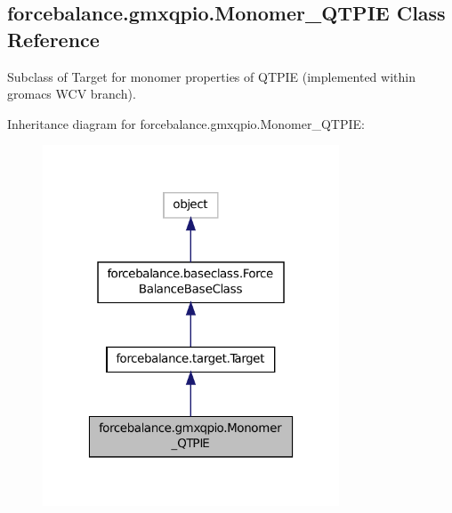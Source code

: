 \hypertarget{classforcebalance_1_1gmxqpio_1_1Monomer__QTPIE}{\subsection{forcebalance.\-gmxqpio.\-Monomer\-\_\-\-Q\-T\-P\-I\-E Class Reference}
\label{classforcebalance_1_1gmxqpio_1_1Monomer__QTPIE}
}


Subclass of Target for monomer properties of Q\-T\-P\-I\-E (implemented within gromacs W\-C\-V branch).  




Inheritance diagram for forcebalance.\-gmxqpio.\-Monomer\-\_\-\-Q\-T\-P\-I\-E\-:
\nopagebreak
\begin{figure}[H]
\begin{center}
\leavevmode
\includegraphics[width=250pt]{classforcebalance_1_1gmxqpio_1_1Monomer__QTPIE__inherit__graph}
\end{center}
\end{figure}


